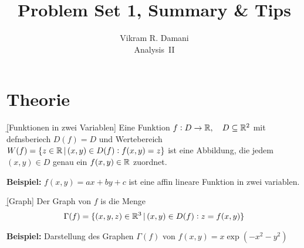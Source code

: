 \documentclass[12pt]{article}
\begin{document}
\title{\vspace*{-2.5em}Problem Set 1, Summary \& Tips}
\author{Vikram R. Damani\\
        Analysis~II}

\maketitle

\section{Theorie}

\begin{defn}{\b{[Funktionen in zwei Variablen]}}
        Eine Funktion $f: D \to \mathbb{R}, \quad D \subseteq \mathbb{R}^2$ mit defnsberiech $D(f)=D$ und Wertebereich $W(f)=\{z\in\mathbb{R}\,|\,(x,y)\in D(f): f(x,y)=z\}$ ist eine Abbildung, die jedem $(x, y) \in D$ genau ein $f(x, y) \in \mathbb{R}$ zuordnet.

        \textbf{Beispiel:} $f(x,y)=ax+by+c$ ist eine affin lineare Funktion in zwei variablen.
\end{defn}

\begin{defn}{\b{[Graph]}} Der Graph von $f$ is die Menge
        \begin{align}
                \Gamma(f)=\{(x,y,z)\in\mathbb{R}^3\,|\,(x,y)\in D(f):z=f(x,y)\}
        \end{align}

        \textbf{Beispiel:} Darstellung des Graphen $\Gamma(f)$ von $f(x,y)=x \exp(-x^2-y^2)$
        \begin{figure}[htbp!]
                \centering
        \end{figure}
\end{defn}
\end{document}
